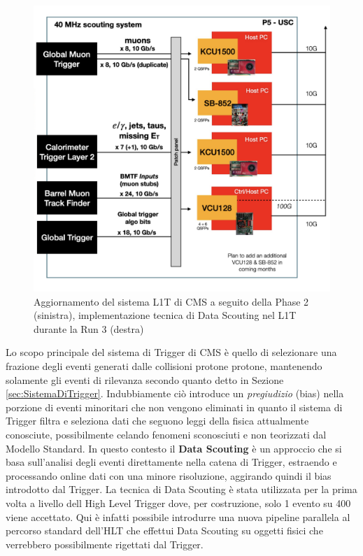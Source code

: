 \begin{figure}[t]
\begin{minipage}[b]{0.48\textwidth}
      \includegraphics[width=\textwidth]{../ImmaginiTesi/DataScoutingRun3.png} 
  \end{minipage}
  \caption{Aggiornamento del sistema L1T di CMS a seguito della Phase 2 (sinistra), implementazione tecnica di Data Scouting nel L1T durante la Run 3 (destra)}
  \label{fig:Scouting}
\end{figure}

Lo scopo principale del sistema di Trigger di CMS è quello di selezionare una frazione degli eventi generati dalle collisioni protone protone, mantenendo solamente gli eventi di rilevanza secondo quanto detto in Sezione \ref{sec:SistemaDiTrigger}. Indubbiamente ciò introduce un \textit{pregiudizio} (bias) nella porzione di eventi minoritari che non vengono eliminati in quanto il sistema di Trigger filtra e seleziona dati che seguono leggi della fisica attualmente conosciute, possibilmente celando fenomeni sconosciuti e non teorizzati dal Modello Standard. \newline
In questo contesto il \textbf{Data Scouting} è un approccio che si basa sull'analisi degli eventi direttamente nella catena di Trigger, estraendo e processando online dati con una minore risoluzione, aggirando quindi il bias introdotto dal Trigger. \newline
La tecnica di Data Scouting è stata utilizzata per la prima volta a livello dell High Level Trigger dove, per costruzione, solo 1 evento su 400 viene accettato. Qui è infatti possibile introdurre una nuova pipeline parallela al percorso standard dell'HLT che effettui Data Scouting su oggetti fisici che verrebbero possibilmente rigettati dal Trigger.


